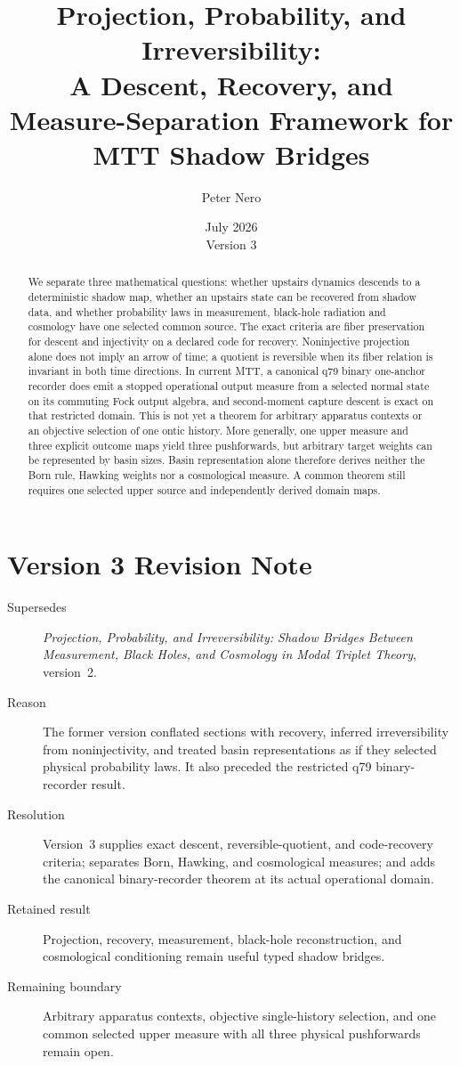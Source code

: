 \documentclass[11pt]{article}
\title{Projection, Probability, and Irreversibility:\\
\large A Descent, Recovery, and Measure-Separation Framework for MTT Shadow Bridges}
\author{Peter Nero}
\date{July 2026\\Version 3}
\begin{document}
\maketitle

\begin{abstract}
We separate three mathematical questions: whether upstairs dynamics descends to a
deterministic shadow map, whether an upstairs state can be recovered from shadow data,
and whether probability laws in measurement, black-hole radiation and cosmology have
one selected common source. The exact criteria are fiber preservation for descent and
injectivity on a declared code for recovery. Noninjective projection alone does not
imply an arrow of time; a quotient is reversible when its fiber relation is invariant
in both time directions. In current MTT, a canonical q79 binary one-anchor recorder
does emit a stopped operational output measure from a selected normal state on its
commuting Fock output algebra, and second-moment capture descent is exact on that
restricted domain. This is not yet a theorem for arbitrary apparatus contexts or an
objective selection of one ontic history. More generally, one upper measure and three
explicit outcome maps yield three pushforwards, but arbitrary target weights can be
represented by basin sizes. Basin representation alone therefore derives neither the
Born rule, Hawking weights nor a cosmological measure. A common theorem still requires
one selected upper source and independently derived domain maps.
\end{abstract}

\section*{Version 3 Revision Note}
\begin{description}
\item[Supersedes] \emph{Projection, Probability, and Irreversibility: Shadow
Bridges Between Measurement, Black Holes, and Cosmology in Modal Triplet
Theory}, version~2.
\item[Reason] The former version conflated sections with recovery, inferred
irreversibility from noninjectivity, and treated basin representations as if
they selected physical probability laws. It also preceded the restricted q79
binary-recorder result.
\item[Resolution] Version~3 supplies exact descent, reversible-quotient, and
code-recovery criteria; separates Born, Hawking, and cosmological measures; and
adds the canonical binary-recorder theorem at its actual operational domain.
\item[Retained result] Projection, recovery, measurement, black-hole
reconstruction, and cosmological conditioning remain useful typed shadow
bridges.
\item[Remaining boundary] Arbitrary apparatus contexts, objective
single-history selection, and one common selected upper measure with all three
physical pushforwards remain open.
\end{description}
\end{document}
